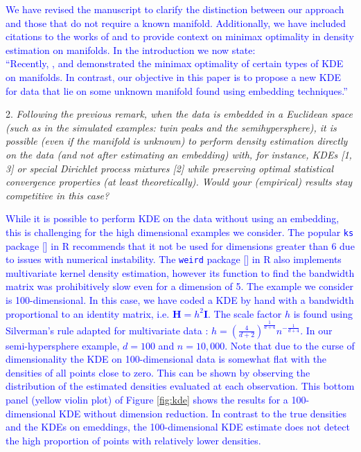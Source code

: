 \documentclass{article}
\begin{document}
   \textcolor{blue}{We have revised the manuscript to clarify the distinction between our approach and those that do not require a known manifold. Additionally, we have included citations to the works of \cite{berenfeld2021-den} and \cite{divol2022measure} to provide context on minimax optimality in density estimation on manifolds. In the introduction we now state:\\
   ``Recently, \cite{berenfeld2021-den}, \cite{berenfeld2022-est} and \cite{divol2022measure} demonstrated the minimax optimality of certain types of KDE on manifolds. In contrast, our objective in this paper is to propose a new KDE for data that lie on some unknown manifold found using embedding techniques.''
   }

2. \textit{Following the previous remark, when the data is embedded in a Euclidean space (such as in the simulated examples: twin peaks and the semihypersphere), it is possible (even if the manifold is unknown) to perform density estimation directly on the data (and not after estimating an embedding) with, for instance, KDEs [1, 3] or special Dirichlet process mixtures [2] while preserving optimal statistical convergence properties (at least theoretically). Would your (empirical) results stay competitive in this case?}

   \textcolor{blue}{While it is possible to perform KDE on the data without using an embedding, this is challenging for the high dimensional examples we consider. The popular \texttt{ks} package [\cite{Duong2007-up}] in R recommends that it not be used for dimensions greater than 6 due to issues with numerical instability. The \texttt{weird} package [\cite{hyndman2024-weird}] in R also implements multivariate kernel density estimation, however its function to find the bandwidth matrix was prohibitively slow even for a dimension of 5. The example we consider is 100-dimensional. In this case, we have coded a KDE by hand with a bandwidth proportional to an identity matrix, i.e. $\mathbf{H} = h^2 \mathbf{I}$. The scale factor $h$ is found using Silverman's rule adapted for multivariate data : $h = \left(\frac{4}{d+2}\right)^{\frac{1}{d+4}} n^{-\frac{1}{d+4}}$. In our semi-hypersphere example, $d=100$ and $n=10,000$. Note that due to the curse of dimensionality the KDE on 100-dimensional data is somewhat flat with the densities of all points close to zero. This can be shown by observing the distribution of the estimated densities evaluated at each observation. This bottom panel (yellow violin plot) of Figure \ref{fig:kde} shows the results for a 100-dimensional KDE without dimension reduction. In contrast to the true densities and the KDEs on emeddings, the 100-dimensional KDE estimate does not detect the high proportion of points with relatively lower densities.}
 
\end{document}

